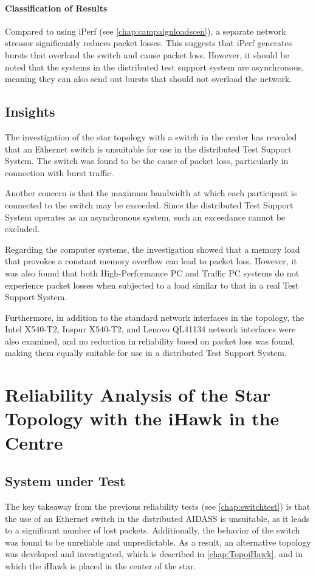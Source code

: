 \paragraph{Classification of Results}
Compared to using iPerf (see \ref{chap:campaignloadscen}), a separate network stressor significantly reduces packet losses. This suggests that iPerf generates bursts that overload the switch and cause packet loss. However, it should be noted that the systems in the distributed test support system are asynchronous, meaning they can also send out bursts that should not overload the network.

\subsection{Insights}
The investigation of the star topology with a switch in the center has revealed that an Ethernet switch is unsuitable for use in the distributed Test Support System. The switch was found to be the cause of packet loss, particularly in connection with burst traffic.

Another concern is that the maximum bandwidth at which each participant is connected to the switch may be exceeded. Since the distributed Test Support System operates as an asynchronous system, such an exceedance cannot be excluded.

Regarding the computer systems, the investigation showed that a memory load that provokes a constant memory overflow can lead to packet loss. However, it was also found that both High-Performance PC and Traffic PC systems do not experience packet losses when subjected to a load similar to that in a real Test Support System.

Furthermore, in addition to the standard network interfaces in the topology, the Intel X540-T2, Inspur X540-T2, and Lenovo QL41134 network interfaces were also examined, and no reduction in reliability based on packet loss was found, making them equally suitable for use in a distributed Test Support System.




\section{Reliability Analysis of the Star Topology with the iHawk in the Centre} \label{chap:ReliabIhawk}

\subsection{System under Test} \label{chap:ReliabIhawk:SuT}
The key takeaway from the previous reliability tests (see \ref{chap:switchtest}) is that the use of an Ethernet switch in the distributed AIDASS is unsuitable, as it leads to a significant number of lost packets. Additionally, the behavior of the switch was found to be unreliable and unpredictable. As a result, an alternative topology was developed and investigated, which is described in \ref{chap:TopoiHawk}, and in which the iHawk is placed in the center of the star.

